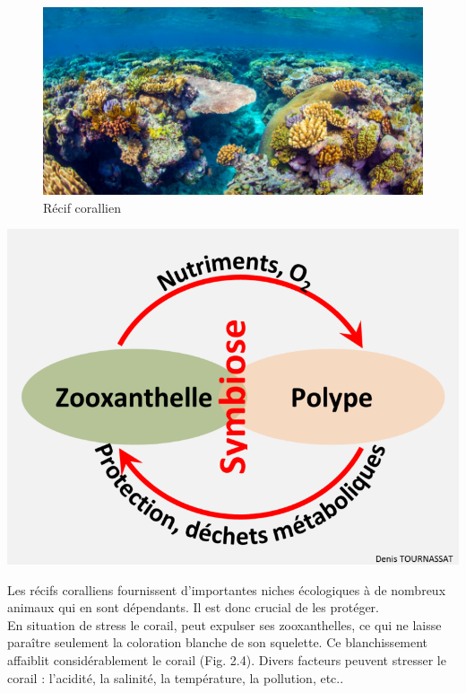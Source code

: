 \documentclass[]{report}
\begin{document}
\begin{figure}
\centering
\includegraphics{../image/recif2.jpg}
\caption{Récif corallien}
\end{figure}

\includegraphics{../image/symbiose.png} \newpage
\null

Les récifs coralliens fournissent d'importantes niches écologiques à de
nombreux animaux qui en sont dépendants. Il est donc crucial de les
protéger.\\
En situation de stress le corail, peut expulser ses zooxanthelles, ce
qui ne laisse paraître seulement la coloration blanche de son squelette.
Ce blanchissement affaiblit considérablement le corail (Fig. 2.4).
Divers facteurs peuvent stresser le corail : l'acidité, la salinité, la
température, la pollution, etc..
\end{document}
